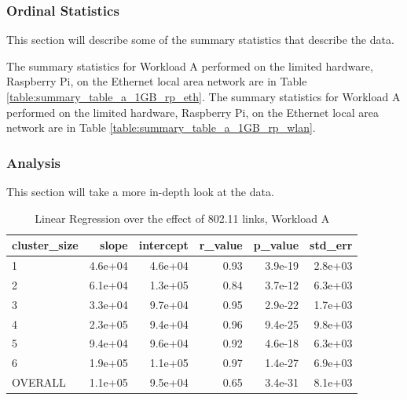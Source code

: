 \subsubsection{Ordinal Statistics}
This section will describe some of the summary statistics that describe the data.  

The summary statistics for Workload A performed on the limited hardware, Raspberry Pi, on the Ethernet local area network are in Table \ref{table:summary_table_a_1GB_rp_eth}.
The summary statistics for Workload A performed on the limited hardware, Raspberry Pi, on the Ethernet local area network are in Table \ref{table:summary_table_a_1GB_rp_wlan}.



\subsubsection{Analysis}
This section will take a more in-depth look at the data.




\begin{table}[H]
\centering
\begin{tabular}{lrrrrr}
\toprule
cluster\_size &   slope &  intercept &  r\_value &  p\_value &  std\_err \\
\midrule
           1 & 4.6e+04 &    4.6e+04 &     0.93 &  3.9e-19 &  2.8e+03 \\
           2 & 6.1e+04 &    1.3e+05 &     0.84 &  3.7e-12 &  6.3e+03 \\
           3 & 3.3e+04 &    9.7e+04 &     0.95 &  2.9e-22 &  1.7e+03 \\
           4 & 2.3e+05 &    9.4e+04 &     0.96 &  9.4e-25 &  9.8e+03 \\
           5 & 9.4e+04 &    9.6e+04 &     0.92 &  4.6e-18 &  6.3e+03 \\
           6 & 1.9e+05 &    1.1e+05 &     0.97 &  1.4e-27 &  6.9e+03 \\
     OVERALL & 1.1e+05 &    9.5e+04 &     0.65 &  3.4e-31 &  8.1e+03 \\
\bottomrule
\end{tabular}
\caption{Linear Regression over the effect of 802.11 links, Workload A}
\label{table:wlan_v_eth_a}
\end{table}





